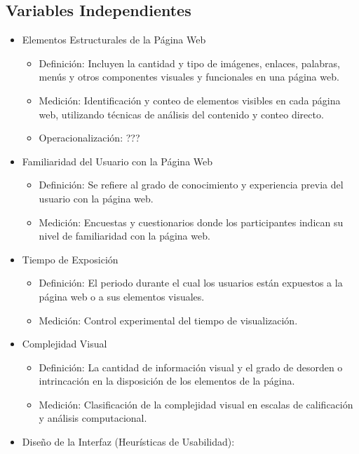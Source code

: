 \subsection{Variables Independientes}
\begin{itemize}
    \item Elementos Estructurales de la Página Web \cite{michailidou2008visual}
    \begin{itemize}
        \item Definición: Incluyen la cantidad y tipo de imágenes, enlaces, palabras, menús y otros componentes visuales y funcionales en una página web.
        \item Medición: Identificación y conteo de elementos visibles en cada página web, utilizando técnicas de análisis del contenido y conteo directo.
        \item Operacionalización: ???
    \end{itemize}
    \item Familiaridad del Usuario con la Página Web
    \begin{itemize}
        \item Definición: Se refiere al grado de conocimiento y experiencia previa del usuario con la página web.
        \item Medición:   Encuestas y cuestionarios donde los participantes indican su nivel de familiaridad con la página web.
    \end{itemize}
    \item Tiempo de Exposición \cite{lindgaard2006attention}
    \begin{itemize}
        \item Definición: El periodo durante el cual los usuarios están expuestos a la página web o a sus elementos visuales.
        \item Medición:  Control experimental del tiempo de visualización.
    \end{itemize}
    \item Complejidad Visual \cite{michailidou2008visual}
    \begin{itemize}
        \item Definición: La cantidad de información visual y el grado de desorden o intrincación en la disposición de los elementos de la página.
        \item Medición: Clasificación de la complejidad visual en escalas de calificación y análisis computacional.
    \end{itemize}
    \item Diseño de la Interfaz (Heurísticas de Usabilidad): \cite{nielsen1990heuristic}

\end{itemize}
